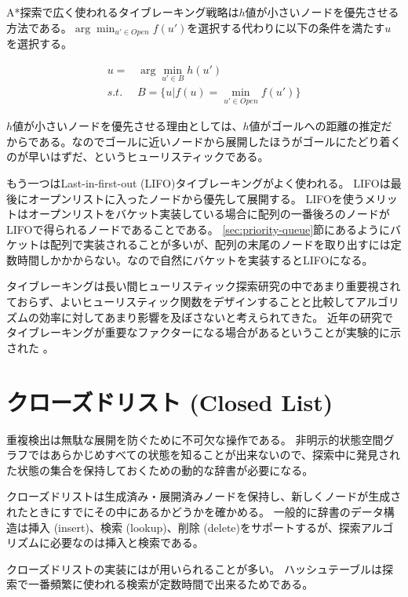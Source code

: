 A*探索で広く使われるタイブレーキング戦略は$h$値が小さいノードを優先させる方法である。$\arg \min_{u' \in Open} f(u')$を選択する代わりに以下の条件を満たす$u$を選択する。

\begin{align}
  u =& \arg \min_{u' \in B} h(u') \\
  s.t. \; \; & B = \{u | f(u) = \min_{u' \in Open} f(u')\}
\end{align}

$h$値が小さいノードを優先させる理由としては、$h$値がゴールへの距離の推定だからである。なのでゴールに近いノードから展開したほうがゴールにたどり着くのが早いはずだ、というヒューリスティックである。

もう一つはLast-in-first-out (LIFO)タイブレーキングがよく使われる。
LIFOは最後にオープンリストに入ったノードから優先して展開する。
LIFOを使うメリットはオープンリストをバケット実装している場合に配列の一番後ろのノードがLIFOで得られるノードであることである。
\ref{sec:priority-queue}節にあるようにバケットは配列で実装されることが多いが、配列の末尾のノードを取り出すには定数時間しかかからない。なので自然にバケットを実装するとLIFOになる。


タイブレーキングは長い間ヒューリスティック探索研究の中であまり重要視されておらず、よいヒューリスティック関数をデザインすることと比較してアルゴリズムの効率に対してあまり影響を及ぼさないと考えられてきた。
近年の研究でタイブレーキングが重要なファクターになる場合があるということが実験的に示された \cite{asai2016tiebreaking}。


\section{クローズドリスト (Closed List)}
\label{sec:closed-list}

重複検出は無駄な展開を防ぐために不可欠な操作である。
非明示的状態空間グラフではあらかじめすべての状態を知ることが出来ないので、探索中に発見された状態の集合を保持しておくための動的な辞書が必要になる。

クローズドリストは生成済み・展開済みノードを保持し、新しくノードが生成されたときにすでにその中にあるかどうかを確かめる。
一般的に辞書のデータ構造は挿入 (insert)、検索 (lookup)、削除 (delete)をサポートするが、探索アルゴリズムに必要なのは挿入と検索である。

クローズドリストの実装にはが用いられることが多い。
ハッシュテーブルは探索で一番頻繁に使われる検索が定数時間で出来るためである。


